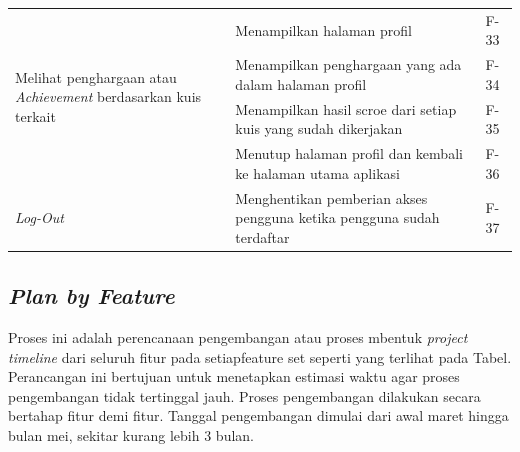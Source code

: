 \begin{table}[H]
\begin{tabular}{|m{3cm}|p{}|p{1cm}|}
		\hline
		\multirow{4}{3cm}{Melihat penghargaan atau \textit{Achievement} berdasarkan kuis terkait} &Menampilkan halaman profil& F-33 \\
		\cline{2-3}
		&Menampilkan penghargaan yang ada dalam halaman profil& F-34 \\
		\cline{2-3}
		&Menampilkan hasil scroe dari setiap kuis yang sudah dikerjakan& F-35 \\
		\cline{2-3}
		&Menutup halaman profil dan kembali ke halaman utama aplikasi& F-36 \\
		\hline
		\multirow{1}{2.5cm}{\textit{Log-Out}} &Menghentikan pemberian akses pengguna ketika pengguna sudah terdaftar& F-37 \\
		\hline
	\end{tabular}
\end{table}
\subsection{\textit{Plan by Feature}}
Proses ini adalah perencanaan pengembangan atau proses mbentuk \textit{project timeline} dari seluruh fitur pada setiapfeature set seperti yang terlihat pada Tabel.
Perancangan ini bertujuan untuk menetapkan estimasi waktu agar proses pengembangan tidak tertinggal jauh.
Proses pengembangan dilakukan secara bertahap fitur demi fitur. Tanggal pengembangan dimulai dari awal maret hingga bulan mei, sekitar kurang lebih 3 bulan.

